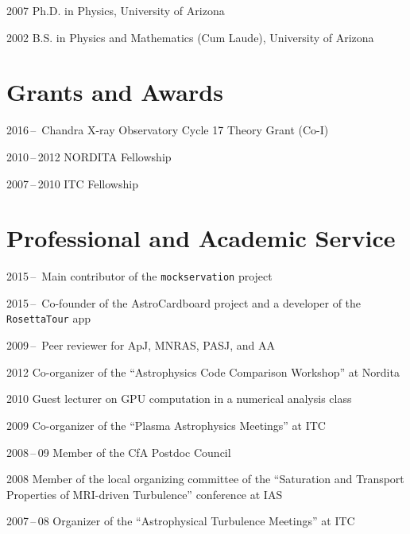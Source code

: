 \begin{tlist}

\item[2007] Ph.D. in Physics, University of Arizona

\item[2002] B.S. in Physics and Mathematics (Cum Laude), University of Arizona

\end{tlist}

\section*{Grants and Awards}

\begin{tlist}

\item[2016\,--\, ] Chandra X-ray Observatory Cycle 17 Theory Grant (Co-I)

\item[2010\,--\,2012] NORDITA Fellowship

\item[2007\,--\,2010] ITC Fellowship

\end{tlist}

\section*{Professional and Academic Service}

\begin{tlist}

\item[2015\,--\,] Main contributor of the \texttt{mockservation} project

\item[2015\,--\,] Co-founder of the AstroCardboard project and a
  developer of the \texttt{RosettaTour} app

\item[2009\,--\,] Peer reviewer for ApJ, MNRAS, PASJ, and AA

\item[2012] Co-organizer of the ``Astrophysics Code Comparison
  Workshop'' at Nordita

\item[2010] Guest lecturer on GPU computation in a numerical analysis class

\item[2009] Co-organizer of the ``Plasma Astrophysics Meetings'' at ITC

\item[2008\,--\,09] Member of the CfA Postdoc Council

\item[2008] Member of the local organizing committee of the
  ``Saturation and Transport Properties of MRI-driven Turbulence''
  conference at IAS

\item[2007\,--\,08] Organizer of the ``Astrophysical Turbulence
  Meetings'' at ITC

\end{tlist}

